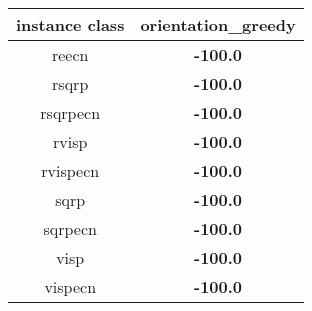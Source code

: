 \begin{tabular}{c|c}
instance class & orientation\_greedy \\ 
\hline
reecn        & {\bf -100.0} \\ 
rsqrp        & {\bf -100.0} \\ 
rsqrpecn     & {\bf -100.0} \\ 
rvisp        & {\bf -100.0} \\ 
rvispecn     & {\bf -100.0} \\ 
sqrp         & {\bf -100.0} \\ 
sqrpecn      & {\bf -100.0} \\ 
visp         & {\bf -100.0} \\ 
vispecn      & {\bf -100.0} \\ 
\end{tabular}